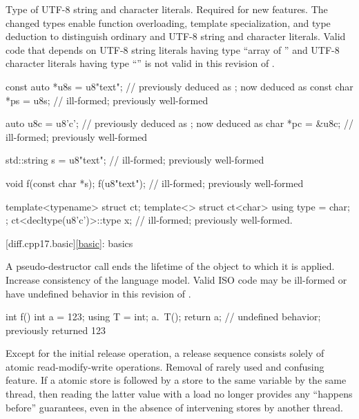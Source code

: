 %
\change
Type of UTF-8 string and character literals.
\rationale
Required for new features.
The changed types enable function overloading, template specialization, and
type deduction to distinguish ordinary and UTF-8 string and character literals.
\effect
Valid \CppXVII{} code that depends on
UTF-8 string literals having type ``array of '' and
UTF-8 character literals having type ``''
is not valid in this revision of \Cpp{}.
\begin{example}
\begin{codeblock}
const auto *u8s = u8"text";     //  previously deduced as ; now deduced as 
const char *ps = u8s;           // ill-formed; previously well-formed

auto u8c = u8'c';               //  previously deduced as ; now deduced as 
char *pc = &u8c;                // ill-formed; previously well-formed

std::string s = u8"text";       // ill-formed; previously well-formed

void f(const char *s);
f(u8"text");                    // ill-formed; previously well-formed

template<typename> struct ct;
template<> struct ct<char> {
  using type = char;
};
ct<decltype(u8'c')>::type x;    // ill-formed; previously well-formed.
\end{codeblock}
\end{example}

[diff.cpp17.basic]{\ref{basic}: basics}

\change
A pseudo-destructor call ends the lifetime of
the object to which it is applied.
\rationale
Increase consistency of the language model.
\effect
Valid ISO \CppXVII{} code may be ill-formed or
have undefined behavior in this revision of \Cpp{}.
\begin{example}
\begin{codeblock}
int f() {
  int a = 123;
  using T = int;
  a.~T();
  return a;         // undefined behavior; previously returned 123
}
\end{codeblock}
\end{example}

\change
Except for the initial release operation,
a release sequence consists solely of atomic read-modify-write operations.
\rationale
Removal of rarely used and confusing feature.
\effect
If a  atomic store is followed
by a  store to the same variable by the same thread,
then reading the latter value with a  load
no longer provides any ``happens before'' guarantees,
even in the absence of intervening stores by another thread.

